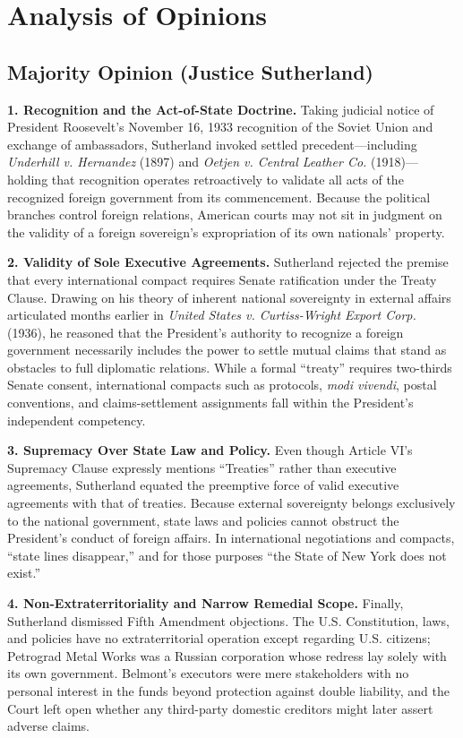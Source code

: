 \documentclass[12pt]{article}
\begin{document}
\section{Analysis of Opinions}
\subsection{Majority Opinion (Justice Sutherland)}

\textbf{1. Recognition and the Act-of-State Doctrine.} Taking judicial notice of President Roosevelt's November 16, 1933 recognition of the Soviet Union and exchange of ambassadors, Sutherland invoked settled precedent---including \textit{Underhill v. Hernandez} (1897) and \textit{Oetjen v. Central Leather Co.} (1918)---holding that recognition operates retroactively to validate all acts of the recognized foreign government from its commencement. Because the political branches control foreign relations, American courts may not sit in judgment on the validity of a foreign sovereign's expropriation of its own nationals' property.

\textbf{2. Validity of Sole Executive Agreements.} Sutherland rejected the premise that every international compact requires Senate ratification under the Treaty Clause. Drawing on his theory of inherent national sovereignty in external affairs articulated months earlier in \textit{United States v. Curtiss-Wright Export Corp.} (1936), he reasoned that the President's authority to recognize a foreign government necessarily includes the power to settle mutual claims that stand as obstacles to full diplomatic relations. While a formal ``treaty'' requires two-thirds Senate consent, international compacts such as protocols, \textit{modi vivendi}, postal conventions, and claims-settlement assignments fall within the President's independent competency.

\textbf{3. Supremacy Over State Law and Policy.} Even though Article VI's Supremacy Clause expressly mentions ``Treaties'' rather than executive agreements, Sutherland equated the preemptive force of valid executive agreements with that of treaties. Because external sovereignty belongs exclusively to the national government, state laws and policies cannot obstruct the President's conduct of foreign affairs. In international negotiations and compacts, ``state lines disappear,'' and for those purposes ``the State of New York does not exist.''

\textbf{4. Non-Extraterritoriality and Narrow Remedial Scope.} Finally, Sutherland dismissed Fifth Amendment objections. The U.S. Constitution, laws, and policies have no extraterritorial operation except regarding U.S. citizens; Petrograd Metal Works was a Russian corporation whose redress lay solely with its own government. Belmont's executors were mere stakeholders with no personal interest in the funds beyond protection against double liability, and the Court left open whether any third-party domestic creditors might later assert adverse claims.
\end{document}
